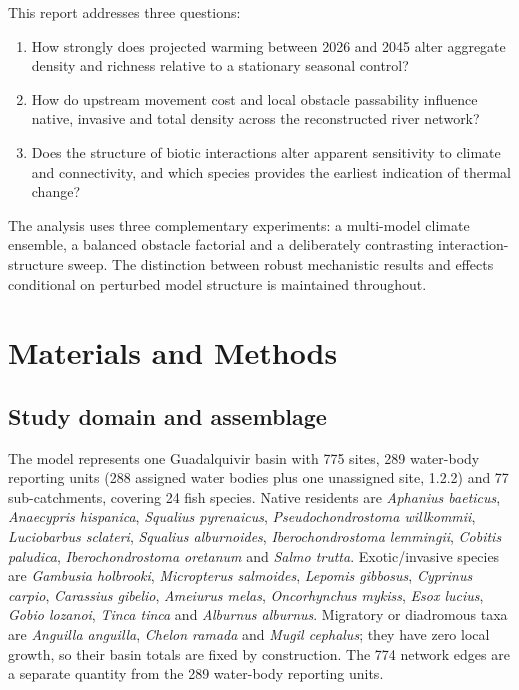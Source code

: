 \documentclass[11pt,a4paper]{article}
\begin{document}
This report addresses three questions:

\begin{enumerate}
    \item How strongly does projected warming between 2026 and 2045 alter aggregate density and richness relative to a stationary seasonal control?
    \item How do upstream movement cost and local obstacle passability influence native, invasive and total density across the reconstructed river network?
    \item Does the structure of biotic interactions alter apparent sensitivity to climate and connectivity, and which species provides the earliest indication of thermal change?
\end{enumerate}

The analysis uses three complementary experiments: a multi-model climate ensemble, a balanced obstacle factorial and a deliberately contrasting interaction-structure sweep. The distinction between robust mechanistic results and effects conditional on perturbed model structure is maintained throughout.

\section{Materials and Methods}

\subsection{Study domain and assemblage}

The model represents one Guadalquivir basin with 775 sites, 289 water-body reporting units (288 assigned water bodies plus one unassigned site, 1.2.2) and 77 sub-catchments, covering 24 fish species. Native residents are \textit{Aphanius baeticus}, \textit{Anaecypris hispanica}, \textit{Squalius pyrenaicus}, \textit{Pseudochondrostoma willkommii}, \textit{Luciobarbus sclateri}, \textit{Squalius alburnoides}, \textit{Iberochondrostoma lemmingii}, \textit{Cobitis paludica}, \textit{Iberochondrostoma oretanum} and \textit{Salmo trutta}. Exotic/invasive species are \textit{Gambusia holbrooki}, \textit{Micropterus salmoides}, \textit{Lepomis gibbosus}, \textit{Cyprinus carpio}, \textit{Carassius gibelio}, \textit{Ameiurus melas}, \textit{Oncorhynchus mykiss}, \textit{Esox lucius}, \textit{Gobio lozanoi}, \textit{Tinca tinca} and \textit{Alburnus alburnus}. Migratory or diadromous taxa are \textit{Anguilla anguilla}, \textit{Chelon ramada} and \textit{Mugil cephalus}; they have zero local growth, so their basin totals are fixed by construction. The 774 network edges are a separate quantity from the 289 water-body reporting units.
\end{document}
